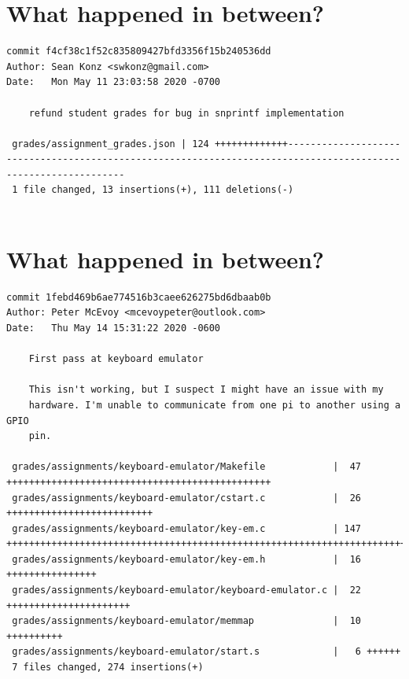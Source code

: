 \documentclass{article}
\begin{document}
\newpage

\section*{What happened in between?}
\vspace{2ex}
\begin{verbatim}
commit f4cf38c1f52c835809427bfd3356f15b240536dd
Author: Sean Konz <swkonz@gmail.com>
Date:   Mon May 11 23:03:58 2020 -0700

    refund student grades for bug in snprintf implementation

 grades/assignment_grades.json | 124 +++++++++++++---------------------------------------------------------------------------------------------------------------
 1 file changed, 13 insertions(+), 111 deletions(-)


\end{verbatim}

\newpage

\section*{What happened in between?}
\vspace{2ex}
\begin{verbatim}
commit 1febd469b6ae774516b3caee626275bd6dbaab0b
Author: Peter McEvoy <mcevoypeter@outlook.com>
Date:   Thu May 14 15:31:22 2020 -0600

    First pass at keyboard emulator
    
    This isn't working, but I suspect I might have an issue with my
    hardware. I'm unable to communicate from one pi to another using a GPIO
    pin.

 grades/assignments/keyboard-emulator/Makefile            |  47 +++++++++++++++++++++++++++++++++++++++++++++++
 grades/assignments/keyboard-emulator/cstart.c            |  26 ++++++++++++++++++++++++++
 grades/assignments/keyboard-emulator/key-em.c            | 147 +++++++++++++++++++++++++++++++++++++++++++++++++++++++++++++++++++++++++++++++++++++++++++++++++++++++++++++++++++++++++++++++++++++++++++++++++++
 grades/assignments/keyboard-emulator/key-em.h            |  16 ++++++++++++++++
 grades/assignments/keyboard-emulator/keyboard-emulator.c |  22 ++++++++++++++++++++++
 grades/assignments/keyboard-emulator/memmap              |  10 ++++++++++
 grades/assignments/keyboard-emulator/start.s             |   6 ++++++
 7 files changed, 274 insertions(+)


\end{verbatim}
\end{document}
